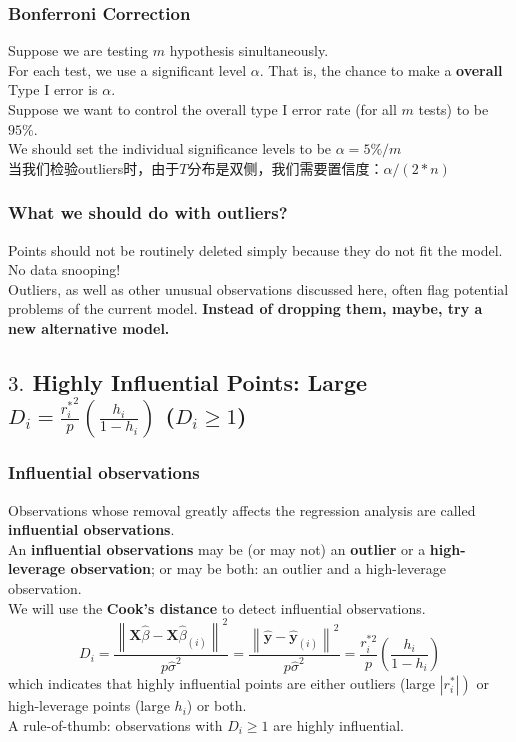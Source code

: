 \documentclass[11pt,a4paper]{article}
\begin{document}
\subsubsection{Bonferroni Correction}
Suppose we are testing $m$ hypothesis sinultaneously.\\
For each test, we use a signiﬁcant level $\alpha$. That is, the chance to make a \textbf{overall} Type I error is $\alpha$.\\
Suppose we want to control the overall type I error rate (for all $m$ tests) to be $95\%$.\\
We should set the individual signiﬁcance levels to be $\alpha = 5\%/m$\\
当我们检验outliers时，由于$T$分布是双侧，我们需要置信度：$\alpha/(2*n)$
\subsubsection{What we should do with outliers?}
Points should not be routinely deleted simply because they do not ﬁt the model. No data snooping!\\
Outliers, as well as other unusual observations discussed here, often ﬂag potential problems of the current model. \textbf{Instead of dropping them, maybe, try a new alternative model.}

\subsection{ $3.$ Highly Inﬂuential Points: Large $D_i=\frac{{r_i^*}^2}{p}(\frac{h_i}{1-h_i})$ \quad ($D_i\geq 1$)}
\subsubsection{Inﬂuential observations}
Observations whose removal greatly aﬀects the regression analysis are called \textbf{inﬂuential observations}.\\
An \textbf{inﬂuential observations} may be (or may not) an \textbf{outlier} or a \textbf{high-leverage observation}; or may be both: an outlier and a high-leverage observation.\\
We will use the \textbf{Cook's distance} to detect influential observations.
$$
D_{i}=\frac{\left\|\mathbf{X} \hat{\beta}-\mathbf{X} \hat{\beta}_{(i)}\right\|^{2}}{p \hat{\sigma}^{2}}=\frac{\left\|\hat{\mathbf{y}}-\hat{\mathbf{y}}_{(i)}\right\|^{2}}{p \hat{\sigma}^{2}}=\frac{r_{i}^{* 2}}{p}\left(\frac{h_{i}}{1-h_{i}}\right)
$$
which indicates that highly influential points are either outliers (large $\left.\left|r_{i}^{*}\right|\right)$ or high-leverage points (large $h_{i}$) or both.\\
A rule-of-thumb: observations with $D_{i} \geq 1$ are highly influential.
\end{document}
